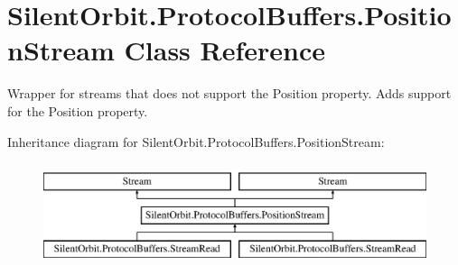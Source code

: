 \hypertarget{class_silent_orbit_1_1_protocol_buffers_1_1_position_stream}{}\section{Silent\+Orbit.\+Protocol\+Buffers.\+Position\+Stream Class Reference}
\label{class_silent_orbit_1_1_protocol_buffers_1_1_position_stream}


Wrapper for streams that does not support the Position property. Adds support for the Position property.  


Inheritance diagram for Silent\+Orbit.\+Protocol\+Buffers.\+Position\+Stream\+:\begin{figure}[H]
\begin{center}
\leavevmode
\includegraphics[height=3.000000cm]{class_silent_orbit_1_1_protocol_buffers_1_1_position_stream}
\end{center}
\end{figure}
